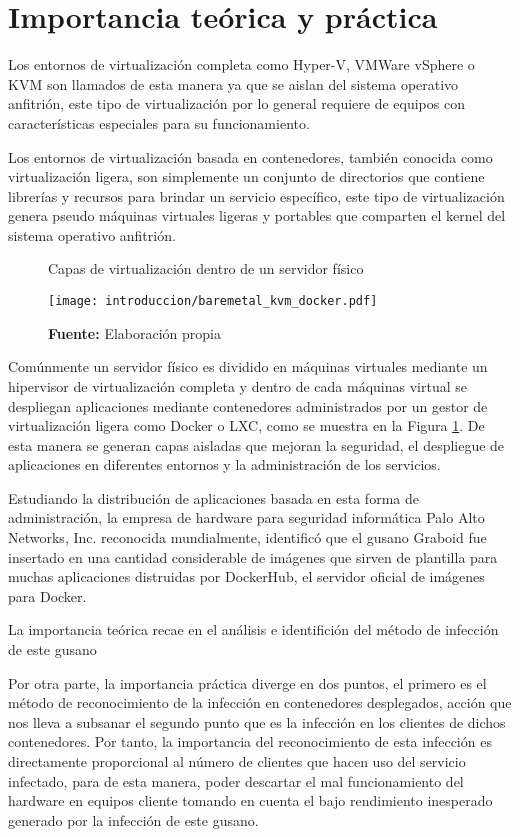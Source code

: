 \documentclass[../main/main.tex]{subfiles}
\begin{document}
  \section{Importancia teórica y práctica}

  Los entornos de virtualización completa como Hyper-V, VMWare vSphere o KVM son llamados de esta manera ya que se aislan del sistema operativo anfitrión, este tipo de virtualización por lo general requiere de equipos con características especiales para su funcionamiento.

  Los entornos de virtualización basada en contenedores, también conocida como virtualización ligera, son simplemente un conjunto de directorios que contiene librerías y recursos para brindar un servicio específico, este tipo de virtualización genera pseudo máquinas virtuales ligeras y portables que comparten el kernel del sistema operativo anfitrión.

  \begin{figure}[ht]
    \centering
    \caption{Capas de virtualización dentro de un servidor físico}
    \texttt{[image: introduccion/baremetal\_kvm\_docker.pdf]}
    \caption*{\textbf{Fuente:} Elaboración propia}
    \label{fig:baremetal_kvm_docker}
  \end{figure}

  Comúnmente un servidor físico es dividido en máquinas virtuales mediante un hipervisor de virtualización completa y dentro de cada máquinas virtual se despliegan aplicaciones mediante contenedores administrados por un gestor de virtualización ligera como Docker o LXC, como se muestra en la Figura \ref{fig:baremetal_kvm_docker}. De esta manera se generan capas aisladas que mejoran la seguridad, el despliegue de aplicaciones en diferentes entornos y la administración de los servicios.

  Estudiando la distribución de aplicaciones basada en esta forma de administración, la empresa de hardware para seguridad informática  Palo Alto Networks, Inc. reconocida mundialmente, identificó que el gusano Graboid fue insertado en una cantidad considerable de imágenes que sirven de plantilla para muchas aplicaciones distruidas por DockerHub, el servidor oficial de imágenes para Docker.

  La importancia teórica recae en el análisis e identifición del método de infección de este gusano

  Por otra parte, la importancia práctica diverge en dos puntos, el primero es el método de reconocimiento de la infección en contenedores desplegados, acción que nos lleva a subsanar el segundo punto que es la infección en los clientes de dichos contenedores. Por tanto, la importancia del reconocimiento de esta infección es directamente proporcional al número de clientes que hacen uso del servicio infectado, para de esta manera, poder descartar el mal funcionamiento del hardware en equipos cliente tomando en cuenta el bajo rendimiento inesperado generado por la infección de este gusano.
\end{document}
